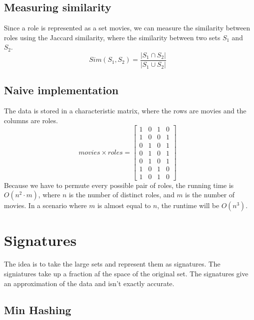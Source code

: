 \documentclass[a4paper,11pt]{article}
\begin{document}
\subsection{Measuring similarity}
Since a role is represented as a set movies, we can measure the similarity between roles using the Jaccard similarity, where the similarity between two sets $S_1$ and $S_2$.
\begin{equation}
Sim(S_1, S_2) = \frac{|S_1 \cap S_2|}{|S_1 \cup S_2|}
\end{equation}

\subsection{Naive implementation}

The data is stored in a characteristic matrix, where the rows are movies and the columns are roles.
\begin{equation}
movies \times roles = 
\begin{bmatrix}
    1 & 0 & 1 & 0\\
    1 & 0 & 0 & 1\\
    0 & 1 & 0 & 1\\
    0 & 1 & 0 & 1\\
    0 & 1 & 0 & 1\\
    1 & 0 & 1 & 0\\
    1 & 0 & 1 & 0
\end{bmatrix}
\end{equation}
Because we have to permute every possible pair of roles, the running time is $O(n^2 \cdot m)$, where $n$ is the number of distinct roles, and $m$ is the number of movies. In a scenario where $m$ is almost equal to $n$, the runtime will be $O(n^3)$.


\section{Signatures}
The idea is to take the large sets and represent them as signatures. The signiatures take up a fraction af the space of the original set. The signatures give an approximation of the data and isn't exactly accurate.

\subsection{Min Hashing}
\end{document}

